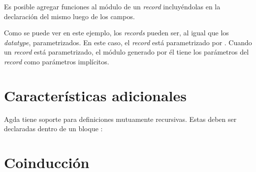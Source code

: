 Es posible agregar funciones al módulo de un \textit{record} incluyéndolas en la declaración del mismo luego de los campos. 


Como se puede ver en este ejemplo, los \textit{records} pueden ser, al igual que los \textit{datatype}, parametrizados. En este caso, el \textit{record}  está parametrizado por . Cuando un \textit{record} está parametrizado, el módulo generado por él tiene los parámetros del \textit{record} como parámetros implícitos.

\section{Características adicionales}\label{agda:additional}

Agda tiene soporte para definiciones mutuamente recursivas. Estas deben ser declaradas dentro de un bloque :


\section{Coinducción}\label{agda:coinduction}


